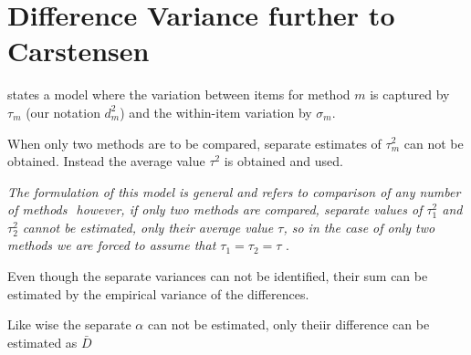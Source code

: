 \documentclass[12pt, a4paper]{report}
\theoremstyle{plain}
\theoremstyle{definition}
\theoremstyle{remark}
\begin{document}

	\section{Difference Variance further to Carstensen}
	
	\citet{BXC2008} states a model where the variation between items
	for method $m$ is captured by $\tau_m$ (our notation $d^2_m$) and the within-item
	variation by $\sigma_m$.
	
When only two methods are to be compared, separate estimates of $\tau^2_m$ can not be obtained. Instead the average value $\tau^2$ is obtained and used.

	
	\emph{The formulation of this model is general and refers to comparison
		of any number of methods  however, if only two methods are
		compared, separate values of $\tau^2_1$ and $\tau^2_2$ cannot be
		estimated, only their average value $\tau$, so in the case of only
		two methods we are forced to assume that $\tau_1 = \tau_2 = \tau$} \citep{BXC2008}.




\newpage
Even though the separate variances can not be identified, their sum can be estimated by the empirical variance of the differences.

Like wise the separate $\alpha$ can not be
estimated, only theiir difference can be estimated as
$\bar{D}$
\end{document}
